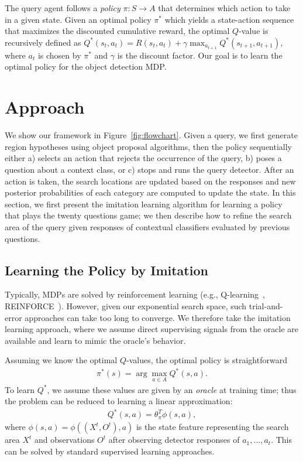 The query agent follows a
\textit{policy} $\pi: S \rightarrow A$ that determines which action to take in a
given state. 
Given an optimal policy $\pi^\ast$ which yields a state-action sequence that maximizes the discounted cumulative reward,
the optimal $Q$-value is recursively defined as $Q^\ast(s_t, a_t) = R(s_t, a_t) + \gamma\max_{a_{t+1}}Q^\ast(s_{t+1}, a_{t+1})$, where $a_t$ is chosen by $\pi^\ast$ and $\gamma$ is the discount factor.
Our goal is to learn the optimal policy for the object detection MDP.

\section{Approach}
We show our framework in Figure~\ref{fig:flowchart}.
Given a query, we first generate region hypotheses using object proposal algorithms, 
then the policy sequentially either a) selects an action that rejects the occurrence of the query, b) poses a question about a context class, or c) stops and runs the query detector. 
After an action is taken, the search locations are updated based on the responses and
new posterior probabilities of each category are computed to update the state.
In this section, we first present the imitation learning algorithm for learning a policy that plays the twenty questions game; 
we then describe how to refine the search area of the query given responses of contextual classifiers evaluated by previous questions.

\subsection{Learning the Policy by Imitation}
Typically, MDPs are solved by reinforcement learning (e.g., Q-learning~\cite{watkins1992q},
REINFORCE~\cite{williams1992simple}). However, given our exponential search space, such trial-and-error
approaches can take too long to converge.
We therefore take the imitation learning approach, where we assume direct supervising
signals from the oracle are available and learn to mimic the oracle's
behavior.

Assuming we know the optimal $Q$-values, the optimal policy is
straightforward 
\begin{eqnarray}
\label{eq:pi}
\pi^\ast(s) = \arg\max_{a\in A} Q^\ast(s,a).
\end{eqnarray}
To learn $Q^\ast$, we assume these values are given
by an \emph{oracle} at training time; thus the
problem can be reduced to learning
a linear approximation:
\begin{eqnarray}
\label{eq:qvalue}
Q^{\ast}(s,a) = \theta_\pi^T \phi(s,a),
\end{eqnarray}
where $\phi(s,a) = \phi((X^t, O^t),a)$ is the state feature representing the search area $X^t$ and observations $O^t$ after observing detector responses of $a_1,...,a_t$. 
This can be solved by standard supervised learning approaches.

